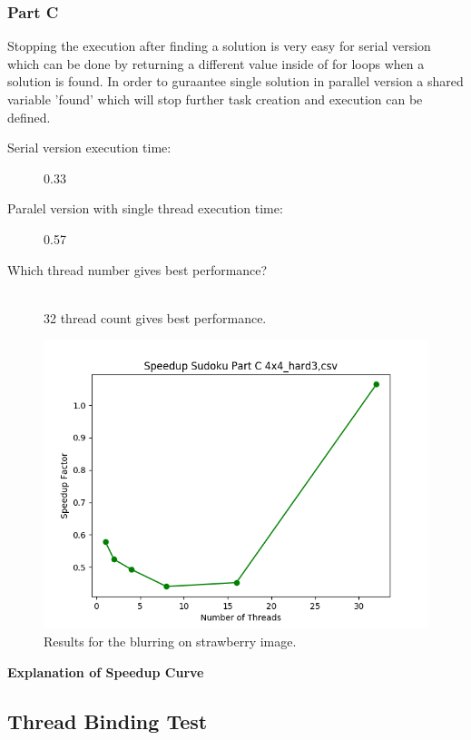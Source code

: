 \documentclass{article}
\newcommand\tab[1][0.5cm]{\hspace*{#1}}
\begin{document}
\newpage

\subsubsection{Part C}
\tab Stopping the execution after finding a solution is very easy for 
serial version which can be done by returning a different value 
inside of for loops when a solution is found.
\newline
\tab In order to guraantee single solution in parallel version a shared variable 'found'
which will stop further task creation and execution can be defined.
\begin{description}
\item[Serial version execution time: ] 0.33
\item[Paralel version with single thread execution time: ] 0.57
\item[Which thread number gives best performance?]\hfill \\
32 thread count gives best performance.
\end{description} 

\begin{figure}[!htb]
        \centering
        \includegraphics[width=1\linewidth]{./img/speedup_part_2_C.png}
        \caption{Results for the blurring on strawberry image.}
\end{figure}
\textbf{Explanation of Speedup Curve}
\\
\tab 
\newpage

\subsection{Thread Binding Test}
\end{document}
